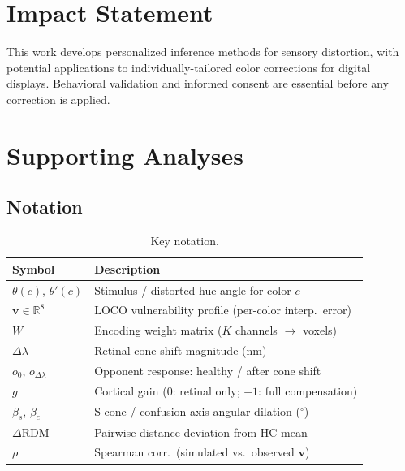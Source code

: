 \documentclass{article}
\begin{document}
\section*{Impact Statement}

This work develops personalized inference methods for sensory distortion, with potential applications to individually-tailored color corrections for digital displays.
Behavioral validation and informed consent are essential before any correction is applied.




\newpage
\appendix
\onecolumn

\section{Supporting Analyses}
\label{app:supporting}

\subsection{Notation}
\label{app:notation}

\begin{table}[h]
  \caption{Key notation.}
  \label{tab:notation}
  \begin{center}
  \begin{small}
  \begin{tabular}{@{}ll@{}}
    \toprule
    Symbol & Description \\
    \midrule
    $\theta(c)$, $\theta'(c)$ & Stimulus / distorted hue angle for color $c$ \\
    $\mathbf{v} \in \mathbb{R}^8$ & LOCO vulnerability profile (per-color interp.\ error) \\
    $W$ & Encoding weight matrix ($K$ channels $\to$ voxels) \\
    $\Delta\lambda$ & Retinal cone-shift magnitude (nm) \\
    $o_0$, $o_{\Delta\lambda}$ & Opponent response: healthy / after cone shift \\
    $g$ & Cortical gain ($0$: retinal only; $-1$: full compensation) \\
    $\beta_s$, $\beta_c$ & S-cone / confusion-axis angular dilation ($^\circ$) \\
    $\Delta$RDM & Pairwise distance deviation from HC mean \\
    $\rho$ & Spearman corr.\ (simulated vs.\ observed $\mathbf{v}$) \\
    \bottomrule
  \end{tabular}
  \end{small}
  \end{center}
\end{table}
\end{document}
